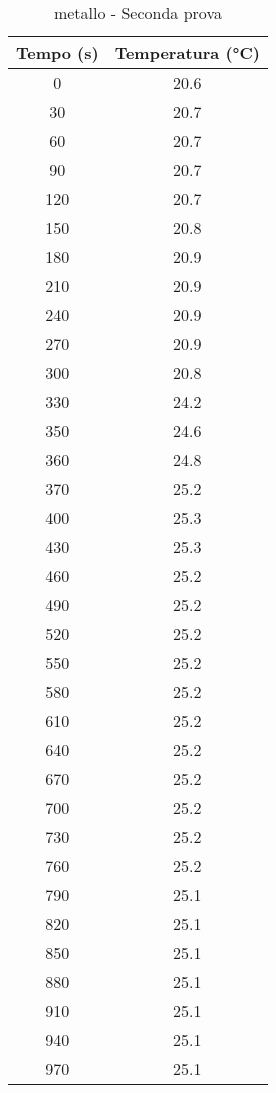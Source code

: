\documentclass[10pt,twocolumn]{article}
\begin{document}
\begin{table}[H]
\hfill
\begin{minipage}{0.5\textwidth}
\centering
\caption*{metallo - Seconda prova}
\begin{tabular}{|c|c|}
\hline
Tempo (s)& Temperatura (°C) \\ 
\hline
0         & 20.6 \\ \hline 
30        & 20.7 \\ \hline 
60        & 20.7 \\ \hline 
90        & 20.7 \\ \hline 
120       & 20.7 \\ \hline 
150       & 20.8 \\ \hline 
180       & 20.9 \\ \hline 
210       & 20.9 \\ \hline 
240       & 20.9 \\ \hline 
270       & 20.9 \\ \hline 
300       & 20.8 \\ \hline 
330       & 24.2 \\ \hline 
350       & 24.6 \\ \hline 
360       & 24.8 \\ \hline 
370       & 25.2 \\ \hline 
400       & 25.3 \\ \hline 
430       & 25.3 \\ \hline 
460       & 25.2 \\ \hline 
490       & 25.2 \\ \hline 
520       & 25.2 \\ \hline 
550       & 25.2 \\ \hline 
580       & 25.2 \\ \hline 
610       & 25.2 \\ \hline 
640       & 25.2 \\ \hline 
670       & 25.2 \\ \hline 
700       & 25.2 \\ \hline 
730       & 25.2 \\ \hline 
760       & 25.2 \\ \hline 
790       & 25.1 \\ \hline 
820       & 25.1 \\ \hline 
850       & 25.1 \\ \hline 
880       & 25.1 \\ \hline 
910       & 25.1 \\ \hline 
940       & 25.1 \\ \hline 
970       & 25.1 \\ \hline 
\end{tabular}
\label{tab:temperatura2}
\end{minipage}
\end{table}
\pagebreak
\end{document}
